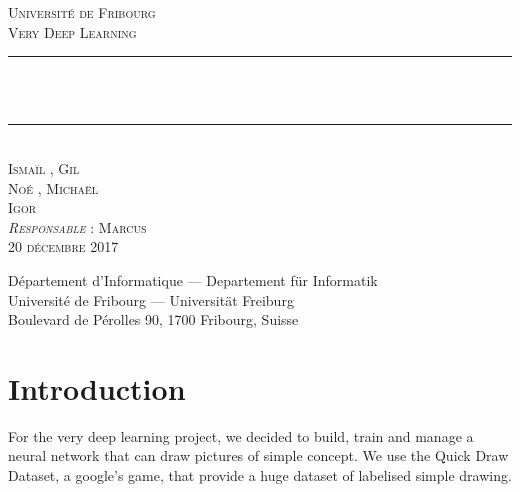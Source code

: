 \documentclass[
  10pt, 
  a4paper,
  oneside, 
  headinclude, 
  footinclude, 
  BCOR5mm, 
]{scrartcl}
\newcommand{\HRule}{\rule{\linewidth}{0.5mm}}
\begin{document}

\begin{titlepage}
  \begin{sffamily}
  \begin{center}
    \textsc{\LARGE Université de Fribourg} \\ [2cm]
    \textsc{\Large Very Deep Learning} \\ [2cm]

    \HRule \\ [0.5cm]
    {\huge{} \\ [0.5cm]}
    \HRule \\ [2cm]
    
    \textsc{
    	\Large Ismaïl , 
    	\Large Gil  \\
    	\Large Noé , 
    	\Large Michaël  \\
    	\Large Igor } \\ [2cm]
    
    \textsc{\large \emph{Responsable} : Marcus } \\ [0.5cm]
    \textsc{\Large 20 décembre 2017} \\    

    \vfill

    Département d’Informatique — Departement für Informatik \\
    Université de Fribourg — Universität Freiburg \\
    Boulevard de Pérolles 90, 1700 Fribourg, Suisse
  \end{center}
  \end{sffamily}
\end{titlepage}

\newpage


\section{Introduction}

For the very deep learning project, we decided to build, train and manage a neural network that can draw pictures of simple concept. We use the Quick Draw Dataset, a google's game, that provide a huge dataset of labelised simple drawing.
\end{document}
